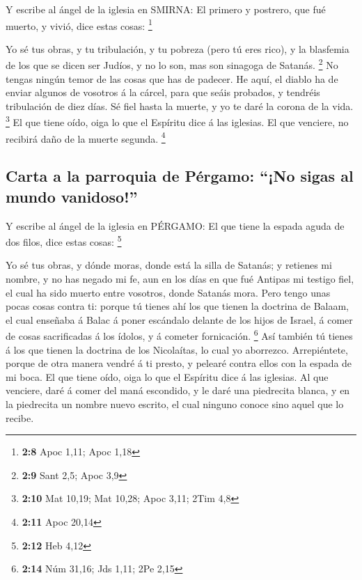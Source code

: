 Y escribe al ángel de la iglesia en SMIRNA: El primero y
postrero, que fué muerto, y vivió, dice estas cosas: \footnote{\textbf{2:8}
  Apoc 1,11; Apoc 1,18}

 Yo sé tus obras, y tu tribulación, y tu pobreza (pero tú
eres rico), y la blasfemia de los que se dicen ser Judíos, y no lo son,
mas son sinagoga de Satanás. \footnote{\textbf{2:9} Sant 2,5; Apoc 3,9}
 No tengas ningún temor de las cosas que has de padecer.
He aquí, el diablo ha de enviar algunos de vosotros á la cárcel, para
que seáis probados, y tendréis tribulación de diez días. Sé fiel hasta
la muerte, y yo te daré la corona de la vida. \footnote{\textbf{2:10}
  Mat 10,19; Mat 10,28; Apoc 3,11; 2Tim 4,8}  El que
tiene oído, oiga lo que el Espíritu dice á las iglesias. El que
venciere, no recibirá daño de la muerte segunda. \footnote{\textbf{2:11}
  Apoc 20,14}

\hypertarget{carta-a-la-parroquia-de-puxe9rgamo-no-sigas-al-mundo-vanidoso}{%
\subsection{Carta a la parroquia de Pérgamo: ``¡No sigas al mundo
vanidoso!''}\label{carta-a-la-parroquia-de-puxe9rgamo-no-sigas-al-mundo-vanidoso}}

 Y escribe al ángel de la iglesia en PÉRGAMO: El que
tiene la espada aguda de dos filos, dice estas cosas: \footnote{\textbf{2:12}
  Heb 4,12}

 Yo sé tus obras, y dónde moras, donde está la silla de
Satanás; y retienes mi nombre, y no has negado mi fe, aun en los días en
que fué Antipas mi testigo fiel, el cual ha sido muerto entre vosotros,
donde Satanás mora.  Pero tengo unas pocas cosas contra
ti: porque tú tienes ahí los que tienen la doctrina de Balaam, el cual
enseñaba á Balac á poner escándalo delante de los hijos de Israel, á
comer de cosas sacrificadas á los ídolos, y á cometer fornicación.
\footnote{\textbf{2:14} Núm 31,16; Jds 1,11; 2Pe 2,15} 
Así también tú tienes á los que tienen la doctrina de los Nicolaítas, lo
cual yo aborrezco.  Arrepiéntete, porque de otra manera
vendré á ti presto, y pelearé contra ellos con la espada de mi boca.
 El que tiene oído, oiga lo que el Espíritu dice á las
iglesias. Al que venciere, daré á comer del maná escondido, y le daré
una piedrecita blanca, y en la piedrecita un nombre nuevo escrito, el
cual ninguno conoce sino aquel que lo recibe.

